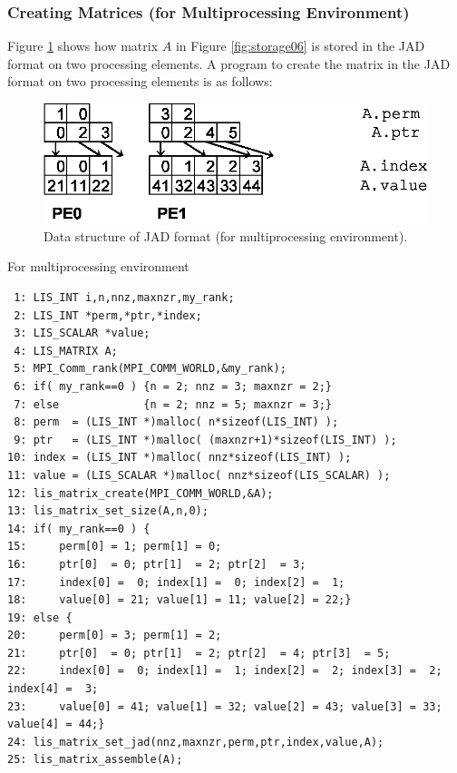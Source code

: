 \documentclass[a4paper]{article}
\begin{document}
\subsubsection{Creating Matrices (for Multiprocessing Environment)}
Figure \ref{fig:storage06_mpi} shows how matrix $A$ in Figure \ref{fig:storage06} is stored in the JAD format on two processing elements. A program to create the matrix in the JAD format on two processing elements is as follows:
\begin{figure}[h]
{\centering 
\includegraphics{storage06_mpi.eps} 
\caption{Data structure of JAD format (for multiprocessing environment).}\label{fig:storage06_mpi}}
\end{figure}
\begin{itemsquarebox}[l]{For multiprocessing environment}
\small
\begin{verbatim}
 1: LIS_INT i,n,nnz,maxnzr,my_rank;
 2: LIS_INT *perm,*ptr,*index;
 3: LIS_SCALAR *value;
 4: LIS_MATRIX A;
 5: MPI_Comm_rank(MPI_COMM_WORLD,&my_rank);
 6: if( my_rank==0 ) {n = 2; nnz = 3; maxnzr = 2;}
 7: else             {n = 2; nnz = 5; maxnzr = 3;}
 8: perm  = (LIS_INT *)malloc( n*sizeof(LIS_INT) );
 9: ptr   = (LIS_INT *)malloc( (maxnzr+1)*sizeof(LIS_INT) );
10: index = (LIS_INT *)malloc( nnz*sizeof(LIS_INT) );
11: value = (LIS_SCALAR *)malloc( nnz*sizeof(LIS_SCALAR) );
12: lis_matrix_create(MPI_COMM_WORLD,&A);
13: lis_matrix_set_size(A,n,0);
14: if( my_rank==0 ) {
15:     perm[0] = 1; perm[1] = 0;
16:     ptr[0]  = 0; ptr[1]  = 2; ptr[2]  = 3;
17:     index[0] =  0; index[1] =  0; index[2] =  1;
18:     value[0] = 21; value[1] = 11; value[2] = 22;}
19: else {
20:     perm[0] = 3; perm[1] = 2;
21:     ptr[0]  = 0; ptr[1]  = 2; ptr[2]  = 4; ptr[3]  = 5;
22:     index[0] =  0; index[1] =  1; index[2] =  2; index[3] =  2; index[4] =  3;
23:     value[0] = 41; value[1] = 32; value[2] = 43; value[3] = 33; value[4] = 44;}
24: lis_matrix_set_jad(nnz,maxnzr,perm,ptr,index,value,A);
25: lis_matrix_assemble(A);
\end{verbatim}
\end{itemsquarebox}
\end{document}
